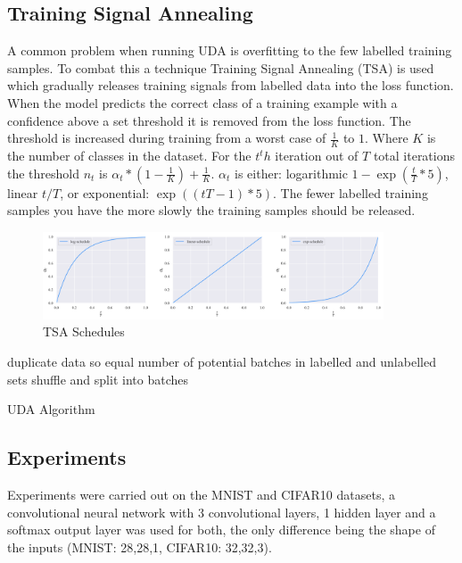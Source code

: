 \documentclass[a4paper]{article}
\begin{document}
\subsection{Training Signal Annealing}
A common problem when running UDA is overfitting to the few labelled training samples. To combat this a technique Training Signal Annealing (TSA) is used which gradually releases training signals from labelled data into the loss function. When the model predicts the correct class of a training example with a confidence above a set threshold it is removed from the loss function. The threshold is increased during training from a worst case of $\frac{1}{K}$ to $1$. Where $K$ is the number of classes in the dataset. For the $t^th$ iteration out of $T$ total iterations the threshold $n_t$ is $\alpha_{t} * (1-\frac{1}{K})+\frac{1}{K}$. $\alpha_t$ is either: logarithmic $1-\exp(\frac{t}{T} * 5)$, linear $t/T$, or exponential: $\exp(({t}{T}-1)*5)$. The fewer labelled training samples you have the more slowly the training samples should be released. 
\begin{figure}[!ht]
  \begin{center}
    \includegraphics[width=0.9\textwidth]{TSA}
    \caption{TSA Schedules}
    \label{fig:objective}
  \end{center}
\end{figure}
\begin{algorithm}[!ht]
\SetAlgoLined
duplicate data so equal number of potential batches in labelled and unlabelled sets\;
shuffle and split into batches\;
\caption{UDA Algorithm}
\label{alg:UDAAlg}
\end{algorithm}

\subsection{Experiments}
Experiments were carried out on the MNIST and CIFAR10 datasets, a convolutional neural network with 3 convolutional layers, 1 hidden layer and a softmax output layer was used for both, the only difference being the shape of the inputs (MNIST: 28,28,1,   CIFAR10: 32,32,3). 
\end{document}
